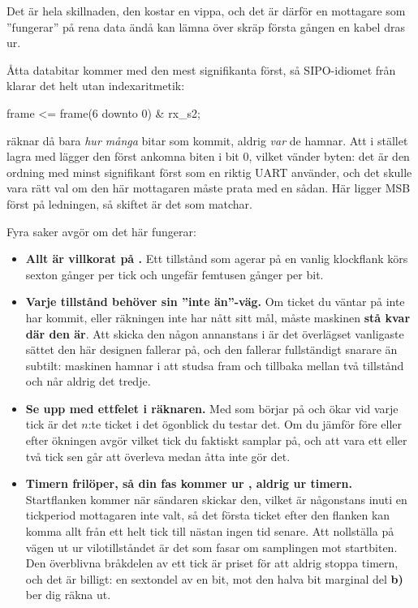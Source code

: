 Det är hela skillnaden, den kostar en vippa, och det är därför en mottagare som ”fungerar” på rena
data ändå kan lämna över skräp första gången en kabel dras ur.

Åtta databitar kommer med den mest signifikanta först, så SIPO-idiomet från 
klarar det helt utan indexaritmetik:

\begin{vhdlcode}
frame <= frame(6 downto 0) & rx_s2;
\end{vhdlcode}

 räknar då bara \emph{hur många} bitar som kommit, aldrig \emph{var} de hamnar. Att
i stället lagra med  lägger den först ankomna biten i bit 0, vilket
vänder byten: det är den ordning med minst signifikant först som en riktig UART använder, och det
skulle vara rätt val om den här mottagaren måste prata med en sådan. Här ligger MSB först på
ledningen, så skiftet är det som matchar.

Fyra saker avgör om det här fungerar:
\begin{itemize}
  \item \textbf{Allt är villkorat på .} Ett tillstånd som agerar på en vanlig
    klockflank körs sexton gånger per tick och ungefär femtusen gånger per bit.
  \item \textbf{Varje tillstånd behöver sin ”inte än”-väg.} Om ticket du väntar på inte har kommit,
    eller räkningen inte har nått sitt mål, måste maskinen \textbf{stå kvar där den är}. Att skicka
    den någon annanstans i  är det överlägset vanligaste sättet den här designen fallerar
    på, och den fallerar fullständigt snarare än subtilt: maskinen hamnar i att studsa fram och
    tillbaka mellan två tillstånd och når aldrig det tredje.
  \item \textbf{Se upp med ettfelet i räknaren.} Med  som börjar på  och ökar
    vid varje tick är det $n$:te ticket  i det ögonblick du testar det. Om du
    jämför före eller efter ökningen avgör vilket tick du faktiskt samplar på, och att vara ett
    eller två tick sen går att överleva medan åtta inte gör det.
  \item \textbf{Timern frilöper, så din fas kommer ur , aldrig ur timern.} Startflanken
    kommer när sändaren skickar den, vilket är någonstans inuti en tickperiod mottagaren inte valt,
    så det första ticket efter den flanken kan komma allt från ett helt tick till nästan ingen tid
    senare. Att nollställa  på vägen ut ur vilotillståndet är det som fasar om
    samplingen mot startbiten. Den överblivna bråkdelen av ett tick är priset för att aldrig stoppa
    timern, och det är billigt: en sextondel av en bit, mot den halva bit marginal del \textbf{b)}
    ber dig räkna ut.
\end{itemize}

